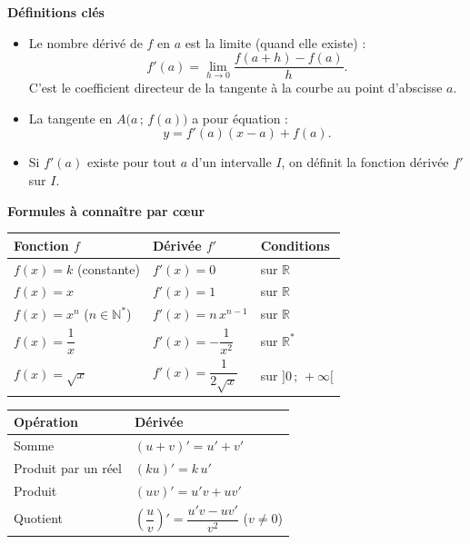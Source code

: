 \documentclass[11pt]{article}
\newcommand{\cle}[1]{{\popxbold\color{popdark}#1}}
\begin{document}
\begin{bilan}
\textbf{Définitions clés}
\begin{itemize}
  \item Le \cle{nombre dérivé} de $f$ en $a$ est la limite (quand elle existe) :
  \[ f'(a)=\lim_{h\to 0}\frac{f(a+h)-f(a)}{h}. \]
  C'est le \cle{coefficient directeur} de la tangente à la courbe au point d'abscisse $a$.
  \item La \cle{tangente} en $A\big(a\,;\,f(a)\big)$ a pour équation :
  \[ y=f'(a)(x-a)+f(a). \]
  \item Si $f'(a)$ existe pour tout $a$ d'un intervalle $I$, on définit la \cle{fonction dérivée} $f'$ sur $I$.
\end{itemize}

\textbf{Formules à connaître par c\oe ur}
\begin{center}
\begin{tabularx}{\linewidth}{|l|X|X|}\hline
\rowcolor{popblueL} \textbf{Fonction $f$} & \textbf{Dérivée $f'$} & \textbf{Conditions} \\ \hline
$f(x)=k$ (constante) & $f'(x)=0$ & sur $\mathbb{R}$ \\ \hline
$f(x)=x$ & $f'(x)=1$ & sur $\mathbb{R}$ \\ \hline
$f(x)=x^n$ ($n\in\mathbb{N}^*$) & $f'(x)=n\,x^{n-1}$ & sur $\mathbb{R}$ \\ \hline
$f(x)=\dfrac{1}{x}$ & $f'(x)=-\dfrac{1}{x^2}$ & sur $\mathbb{R}^*$ \\ \hline
$f(x)=\sqrt{x}$ & $f'(x)=\dfrac{1}{2\sqrt{x}}$ & sur $]0\,;\,+\infty[$ \\ \hline
\end{tabularx}
\end{center}

\begin{center}
\begin{tabularx}{\linewidth}{|l|X|}\hline
\rowcolor{popblueL} \textbf{Opération} & \textbf{Dérivée} \\ \hline
Somme & $(u+v)'=u'+v'$ \\ \hline
Produit par un réel & $(ku)'=k\,u'$ \\ \hline
Produit & $(uv)'=u'v+uv'$ \\ \hline
Quotient & $\left(\dfrac{u}{v}\right)'=\dfrac{u'v-uv'}{v^2}$ \quad ($v\neq 0$) \\ \hline
\end{tabularx}
\end{center}


\end{bilan}
\end{document}
